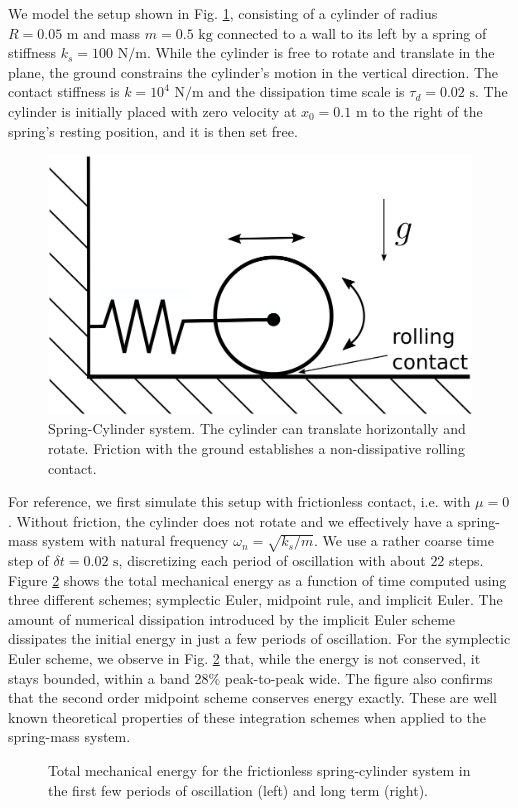 We model the setup shown in Fig. \ref{fig:spring_cylinder}, consisting of a
cylinder of radius $R=0.05\text{ m}$ and mass $m=0.5\text{ kg}$ connected to a
wall to its left by a spring of stiffness $k_s=100\text{ N}/\text{m}$. While the
cylinder is free to rotate and translate in the plane, the ground constrains the
cylinder's motion in the vertical direction. The contact stiffness is
$k=10^{4}\text{ N}/\text{m}$ and the dissipation time scale is
$\tau_d=0.02\text{ s}$. The cylinder is initially placed with zero velocity at
$x_0=0.1\text{ m}$ to the right of the spring's resting position, and it is then
set free.
\begin{figure}[!h]
	\centering
	\includegraphics[width=0.6\columnwidth]{figures/schematics/spring_mass.png}
	\caption{\label{fig:spring_cylinder} 
	Spring-Cylinder system. The cylinder can translate horizontally and rotate.
	Friction with the ground establishes a non-dissipative rolling contact.}
\end{figure}

For reference, we first simulate this setup with frictionless contact, i.e.
with $\mu=0$. Without friction, the cylinder does not rotate and we effectively have
a spring-mass system with natural frequency $\omega_n=\sqrt{k_s/m}$. We use a
rather coarse time step of $\delta t=0.02\text{ s}$, discretizing each period of
oscillation with about $22$ steps. Figure
\ref{fig:frictionless_spring_cylinder_energy} shows the total mechanical energy
as a function of time computed using three different schemes; symplectic Euler,
midpoint rule, and implicit Euler. The amount of numerical dissipation
introduced by the implicit Euler scheme dissipates the initial energy in just a
few periods of oscillation. For the symplectic Euler scheme, we observe in Fig.
\ref{fig:frictionless_spring_cylinder_energy} that, while the energy is not
conserved, it stays bounded, within a band 28\% peak-to-peak wide. The figure
also confirms that the second order midpoint scheme conserves energy exactly.
These are well known theoretical properties of these integration schemes when
applied to the spring-mass system.
\begin{figure}[!h]
    \centering
    \caption{\label{fig:frictionless_spring_cylinder_energy} 
    Total mechanical energy for the frictionless spring-cylinder system in the
    first few periods of oscillation (left) and long term (right).}
\end{figure}

